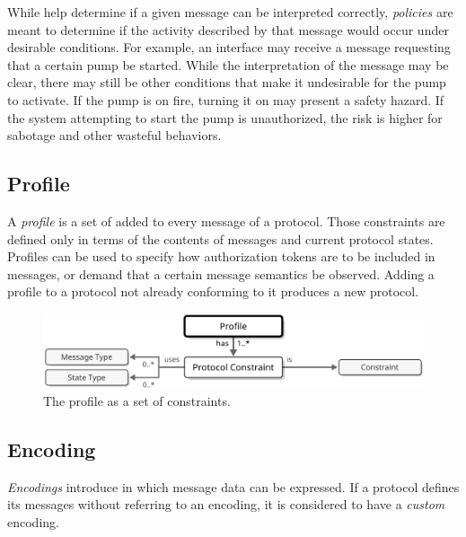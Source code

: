 \vfill

While  help determine if a given message can be interpreted correctly, \textit{policies} are meant to determine if the activity described by that message would occur under desirable conditions.
For example, an interface may receive a message requesting that a certain pump be started.
While the interpretation of the message may be clear, there may still be other conditions that make it undesirable for the pump to activate.
If the pump is on fire, turning it on may present a safety hazard.
If the system attempting to start the pump is unauthorized, the risk is higher for sabotage and other wasteful behaviors.

\newpage

\subsection{Profile}
\label{sec:concepts:profile}

A \textit{profile} is a set of  added to every message of a protocol.
Those constraints are defined only in terms of the contents of messages and current protocol states.
Profiles can be used to specify how authorization tokens are to be included in messages, or demand that a certain message semantics be observed.
Adding a profile to a protocol not already conforming to it produces a new protocol.

\begin{figure}[ht!]
  \centering
  \includegraphics[scale=0.9]{figures/profile}
  \caption{
    The profile as a set of constraints.
  }
  \label{fig:profile}
\end{figure}

\subsection{Encoding}
\label{sec:concepts:encoding}

\textit{Encodings} introduce  in which message data can be expressed.
If a protocol defines its messages without referring to an encoding, it is considered to have a \textit{custom} encoding.
